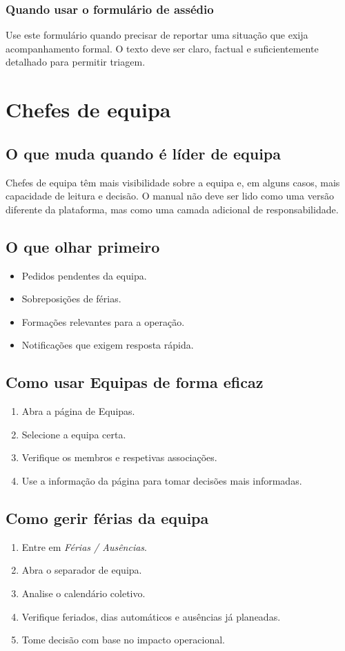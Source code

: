 \subsection{Quando usar o formulário de assédio}
Use este formulário quando precisar de reportar uma situação que exija acompanhamento formal. O texto deve ser claro, factual e suficientemente detalhado para permitir triagem.

\chapter{Chefes de equipa}
\section{O que muda quando é líder de equipa}
Chefes de equipa têm mais visibilidade sobre a equipa e, em alguns casos, mais capacidade de leitura e decisão. O manual não deve ser lido como uma versão diferente da plataforma, mas como uma camada adicional de responsabilidade.

\section{O que olhar primeiro}
\begin{itemize}
  \item Pedidos pendentes da equipa.
  \item Sobreposições de férias.
  \item Formações relevantes para a operação.
  \item Notificações que exigem resposta rápida.
\end{itemize}

\section{Como usar Equipas de forma eficaz}
\begin{enumerate}
  \item Abra a página de Equipas.
  \item Selecione a equipa certa.
  \item Verifique os membros e respetivas associações.
  \item Use a informação da página para tomar decisões mais informadas.
\end{enumerate}

\section{Como gerir férias da equipa}
\begin{enumerate}
  \item Entre em \textit{Férias / Ausências}.
  \item Abra o separador de equipa.
  \item Analise o calendário coletivo.
  \item Verifique feriados, dias automáticos e ausências já planeadas.
  \item Tome decisão com base no impacto operacional.
\end{enumerate}

